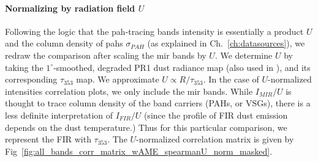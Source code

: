         \paragraph{Normalizing by radiation field $U$}
          Following the logic that the \gls{pah}-tracing bands intensity is essentially a product $U$ and the column density of \gls{pah}s $\sigma_{PAH}$ (as explained in Ch.~\ref{ch:datasources}), we redraw the comparison after scaling the \gls{mir} bands by $U$. We determine $U$ by taking the $1^{\circ}$-smoothed, degraded PR1 dust radiance map (also used in \citep{hensley16}), and its corresponding $\tau_{353}$ map. We approximate $U \propto R/\tau_{353}$. In the case of $U$-normalized intensities correlation plots, we only include the \gls{mir} bands. While $I_{MIR}/U$ is thought to trace column density of the band carriers (PAHs, or VSGs), there is a less definite interpretation of $I_{FIR}/U$ (since the profile of FIR dust emission depends on the dust temperature.) Thus for this particular comparison, we represent the FIR with $\tau_{353}$. The $U$-normalized correlation matrix is given by Fig~\ref{fig:all_bands_corr_matrix_wAME_spearmanU_norm_masked}.
